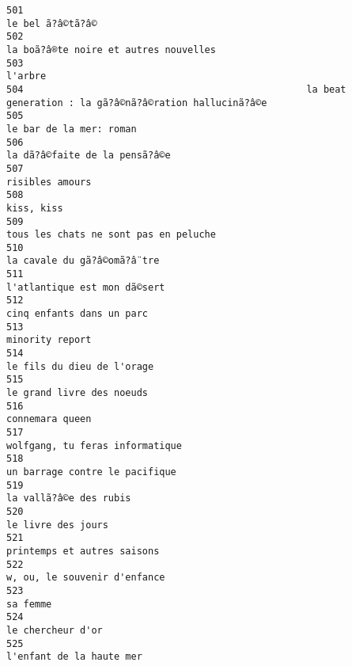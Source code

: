 \documentclass[
]{report}
\begin{document}
\begin{verbatim}
501                                                                                        le bel ã?â©tã?â©
502                                                                   la boã?â®te noire et autres nouvelles
503                                                                                                 l'arbre
504                                                  la beat generation : la gã?â©nã?â©ration hallucinã?â©e
505                                                                                 le bar de la mer: roman
506                                                                           la dã?â©faite de la pensã?â©e
507                                                                                         risibles amours
508                                                                                              kiss, kiss
509                                                                   tous les chats ne sont pas en peluche
510                                                                             la cavale du gã?â©omã?â¨tre
511                                                                            l'atlantique est mon dã©sert
512                                                                               cinq enfants dans un parc
513                                                                                         minority report
514                                                                              le fils du dieu de l'orage
515                                                                               le grand livre des noeuds
516                                                                                         connemara queen
517                                                                         wolfgang, tu feras informatique
518                                                                          un barrage contre le pacifique
519                                                                                  la vallã?â©e des rubis
520                                                                                      le livre des jours
521                                                                             printemps et autres saisons
522                                                                            w, ou, le souvenir d'enfance
523                                                                                                sa femme
524                                                                                       le chercheur d'or
525                                                                                l'enfant de la haute mer

\end{verbatim}
\end{document}
